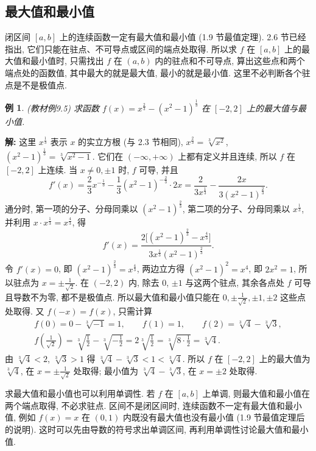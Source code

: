 \documentclass[UTF8,openany]{ctexbook}
\theoremstyle{chinesetextbook}
\newtheorem{example}{例}[section]
\newenvironment{cnsolution}{\par\indent\textbf{解:} \ignorespaces}{\par}
\begin{document}
\subsection{最大值和最小值}
闭区间 $[a,b]$ 上的连续函数一定有最大值和最小值 (1.9 节最值定理). 2.6 节已经指出, 它们只能在驻点、不可导点或区间的端点处取得. 所以求 $f$ 在 $[a,b]$ 上的最大值和最小值时, 只需找出 $f$ 在 $(a,b)$ 内的驻点和不可导点, 算出这些点和两个端点处的函数值, 其中最大的就是最大值, 最小的就是最小值. 这里不必判断各个驻点是不是极值点.
\begin{example}\label{ex:c2-9-5}
\textnormal{(教材例9.5)} 求函数 $f(x)=x^{\frac23}-(x^2-1)^{\frac13}$ 在 $[-2,2]$ 上的最大值与最小值.
\end{example}
\begin{cnsolution}
这里 $x^{\frac13}$ 表示 $x$ 的实立方根 (与 2.3 节相同), $x^{\frac23}=\sqrt[3]{x^2}$, $(x^2-1)^{\frac13}=\sqrt[3]{x^2-1}$. 它们在 $(-\infty,+\infty)$ 上都有定义并且连续, 所以 $f$ 在 $[-2,2]$ 上连续. 当 $x\ne0,\pm1$ 时, $f$ 可导, 并且
\[
f'(x)=\frac23x^{-\frac13}-\frac13(x^2-1)^{-\frac23}\cdot2x=\frac2{3x^{\frac13}}-\frac{2x}{3(x^2-1)^{\frac23}}.
\]
通分时, 第一项的分子、分母同乘以 $(x^2-1)^{\frac23}$, 第二项的分子、分母同乘以 $x^{\frac13}$, 并利用 $x\cdot x^{\frac13}=x^{\frac43}$, 得
\[
f'(x)=\frac{2\bigl[(x^2-1)^{\frac23}-x^{\frac43}\bigr]}{3x^{\frac13}(x^2-1)^{\frac23}}.
\]
令 $f'(x)=0$, 即 $(x^2-1)^{\frac23}=x^{\frac43}$, 两边立方得 $(x^2-1)^2=x^4$, 即 $2x^2=1$, 所以驻点为 $\displaystyle x=\pm\frac1{\sqrt2}$. 在 $(-2,2)$ 内, 除去 $0$, $\pm1$ 与这两个驻点, 其余各点处 $f$ 可导且导数不为零, 都不是极值点. 所以最大值和最小值只能在 $\displaystyle0,\pm\frac1{\sqrt2},\pm1,\pm2$ 这些点处取得. 又 $f(-x)=f(x)$, 只需计算
\[
\begin{gathered}
f(0)=0-\sqrt[3]{-1}=1,\qquad f(1)=1,\qquad f(2)=\sqrt[3]4-\sqrt[3]3,\\
f\left(\frac1{\sqrt2}\right)=\sqrt[3]{\frac12}-\sqrt[3]{-\frac12}=2\sqrt[3]{\frac12}=\sqrt[3]{8\cdot\frac12}=\sqrt[3]4.
\end{gathered}
\]
由 $\sqrt[3]4<2$, $\sqrt[3]3>1$ 得 $\sqrt[3]4-\sqrt[3]3<1<\sqrt[3]4$. 所以 $f$ 在 $[-2,2]$ 上的最大值为 $\sqrt[3]4$, 在 $\displaystyle x=\pm\frac1{\sqrt2}$ 处取得; 最小值为 $\sqrt[3]4-\sqrt[3]3$, 在 $x=\pm2$ 处取得.
\end{cnsolution}
求最大值和最小值也可以利用单调性. 若 $f$ 在 $[a,b]$ 上单调, 则最大值和最小值在两个端点取得, 不必求驻点. 区间不是闭区间时, 连续函数不一定有最大值和最小值, 例如 $f(x)=x$ 在 $(0,1)$ 内既没有最大值也没有最小值 (1.9 节最值定理后的说明). 这时可以先由导数的符号求出单调区间, 再利用单调性讨论最大值和最小值.
\end{document}
